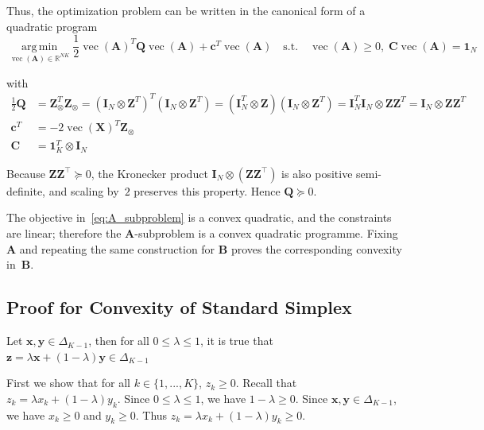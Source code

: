 \documentclass{article}
\DeclareMathOperator*{\argmin}{arg\,min}
\begin{document}
Thus, the optimization problem can be written in the canonical form of a quadratic program
\begin{equation}
    \underset{\operatorname{vec}(\mathbf{A}) \in \mathbb{R}^{NK}}{\argmin}
    \frac{1}{2} \operatorname{vec}(\mathbf{A})^T \mathbf{Q} \operatorname{vec}(\mathbf{A}) + \mathbf{c}^T \operatorname{vec}(\mathbf{A})
    \quad\text{s.t.}\quad
    \operatorname{vec}(\mathbf{A}) \geq 0, \;
    \mathbf{C} \operatorname{vec}(\mathbf{A}) = \mathbf{1}_N
\end{equation}

with
\begin{equation}
    \begin{aligned}
        \frac{1}{2} \mathbf{Q} &= \mathbf{Z}_{\otimes}^T \mathbf{Z}_{\otimes}
        = (\mathbf{I}_N \otimes \mathbf{Z}^T)^T (\mathbf{I}_N \otimes \mathbf{Z}^T)
        = (\mathbf{I}_N^T \otimes \mathbf{Z}) (\mathbf{I}_N \otimes \mathbf{Z}^T)
        = \mathbf{I}_N^T \mathbf{I}_N \otimes \mathbf{Z} \mathbf{Z}^T
        = \mathbf{I}_N \otimes \mathbf{Z} \mathbf{Z}^T
        \\
        \mathbf{c}^T &= - 2 \operatorname{vec}(\mathbf{X})^T \mathbf{Z}_{\otimes} \\
        \mathbf{C} &= \mathbf{1}_K^T \otimes \mathbf{I}_N
    \end{aligned}
\end{equation}

Because $\mathbf Z\mathbf Z^{\!\top}\succeq0$, the Kronecker product $\mathbf I_N\otimes(\mathbf Z\mathbf Z^{\!\top})$ is also positive semi-definite, and scaling by~\(2\) preserves this property. Hence $\mathbf{Q} \succeq 0$.

The objective in~\eqref{eq:A_subproblem} is a convex quadratic, and the constraints are linear; therefore the $\mathbf{A}$-subproblem is a convex quadratic programme. Fixing $\mathbf{A}$ and repeating the same construction for
$\mathbf{B}$ proves the corresponding convexity in~$\mathbf{B}$.

\subsection{Proof for Convexity of Standard Simplex}
\label{subsec:convexity_simplex}

Let $\mathbf{x}, \mathbf{y} \in \Delta_{K-1}$, then for all $0 \leq \lambda \leq 1$, it is true that $\mathbf{z}=\lambda \mathbf{x} + (1-\lambda) \mathbf{y} \in \Delta_{K-1}$

First we show that for all $k \in \{1, ..., K\}$, $z_k \geq 0$. Recall that $z_k = \lambda x_k + (1-\lambda) y_k$. Since $0 \leq \lambda \leq 1$, we have $1-\lambda \geq 0$. Since $\mathbf{x}, \mathbf{y} \in \Delta_{K-1}$, we have $x_k \geq 0$ and $y_k \geq 0$. Thus $z_k = \lambda x_k + (1-\lambda) y_k \geq 0$.
\end{document}
